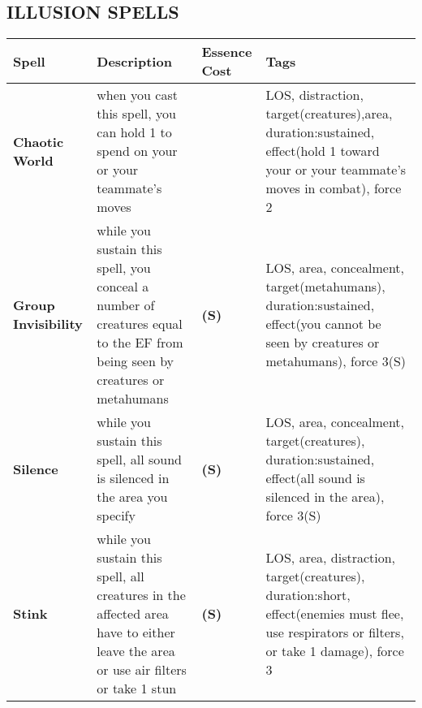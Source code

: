 \documentclass[oneside,10pt]{article}
\begin{document}
\subsection{ILLUSION SPELLS}
\begin{tabular}{>{\bfseries}m{.1\linewidth}m{.34\linewidth}>{\bfseries\centering}m{.11\linewidth}m{.35\linewidth}}
Spell& \textbf{Description}&Essence Cost&\textbf{Tags}\\\midrule
Chaotic World& when you cast this spell, you can hold 1 to
spend on your or your teammate’s moves&2& LOS,
distraction, target(creatures),area, duration:sustained, effect(hold
1 toward your or your teammate’s moves in combat), force 2\\
Group Invisibility& while you sustain this spell, you conceal
a number of creatures equal to the EF from being
seen by creatures or metahumans& 3(S) & LOS, area, concealment, target(metahumans),
duration:sustained, effect(you cannot be seen by creatures or
metahumans), force 3(S)\\
Silence& while you sustain this spell, all sound is silenced
in the area you specify&3(S)& LOS, area, concealment, target(creatures),
duration:sustained, effect(all sound is silenced in the area),
force 3(S)\\
Stink& while you sustain this spell, all creatures in the affected
area have to either leave the area or use air filters or take
1 stun&3(S)&LOS, area, distraction, target(creatures),
duration:short, effect(enemies must flee, use respirators or
filters, or take 1 damage), force 3\\
\bottomrule
\end{tabular}
\end{document}
